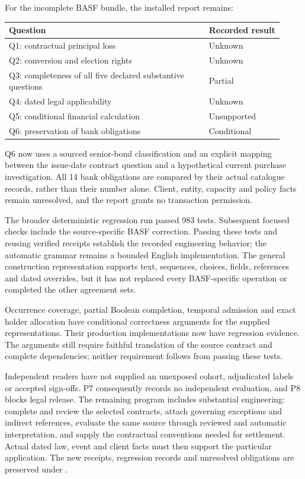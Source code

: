 For the incomplete BASF bundle, the installed report remains:
\begin{center}
\small
\begin{tabular}{p{0.67\linewidth}p{0.25\linewidth}}
\textbf{Question} & \textbf{Recorded result}\\
\hline
Q1: contractual principal loss & Unknown\\
Q2: conversion and election rights & Unknown\\
Q3: completeness of all five declared substantive questions & Partial\\
Q4: dated legal applicability & Unknown\\
Q5: conditional financial calculation & Unsupported\\
Q6: preservation of bank obligations & Conditional\\
\end{tabular}
\end{center}
Q6 now uses a sourced senior-bond classification and an explicit mapping between
the issue-date contract question and a hypothetical current purchase
investigation. All 14 bank obligations are compared by their actual catalogue
records, rather than their number alone. Client, entity, capacity and policy
facts remain unresolved, and the report grants no transaction permission.

The broader deterministic regression run passed 983 tests. Subsequent focused
checks include the source-specific BASF correction. Passing these tests and
reusing verified receipts establish the recorded engineering behavior; the
automatic grammar remains a bounded English implementation. The general
construction representation supports text, sequences, choices, fields,
references and dated overrides, but it has not replaced every BASF-specific
operation or completed the other agreement sets.

Occurrence coverage, partial Boolean completion, temporal admission and exact
holder allocation have conditional correctness arguments for the supplied
representations. Their production implementations now have regression evidence.
The arguments still require faithful translation of the source contract and
complete dependencies; neither requirement follows from passing these tests.

Independent readers have not supplied an unexposed cohort, adjudicated labels
or accepted sign-offs. P7 consequently records no independent evaluation, and
P8 blocks legal release. The remaining program includes substantial engineering:
complete and review the selected contracts, attach governing exceptions and
indirect references, evaluate the same source through reviewed and automatic
interpretation, and supply the contractual conventions needed for settlement.
Actual dated law, event and client facts must then support the particular
application. The new receipts, regression records and unresolved obligations
are preserved under .
